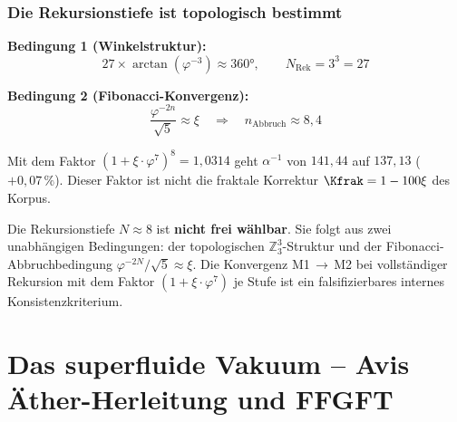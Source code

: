 \subsubsection*{Die Rekursionstiefe ist topologisch bestimmt}

\textbf{Bedingung 1 (Winkelstruktur):}
\[
  27 \times \arctan(\varphi^{-3}) \approx 360°, \qquad N_{\text{Rek}} = 3^3 = 27
\]

\textbf{Bedingung 2 (Fibonacci-Konvergenz):}
\[
  \frac{\varphi^{-2n}}{\sqrt{5}} \approx \xi \quad \Rightarrow \quad n_{\text{Abbruch}} \approx 8{,}4
\]

Mit dem Faktor $(1 + \xi\cdot\varphi^7)^8 = 1{,}0314$ geht $\alpha^{-1}$ von $141{,}44$ auf $137{,}13$ ($+0{,}07\,\%$). Dieser Faktor ist nicht die fraktale Korrektur $\Kfrak = 1-100\xi$ des Korpus.

\begin{keyresult}[Konvergenzkriterium]
Die Rekursionstiefe $N \approx 8$ ist \textbf{nicht frei wählbar}. Sie folgt aus zwei unabhängigen Bedingungen: der topologischen $\mathbb{Z}_3^3$-Struktur und der Fibonacci-Abbruchbedingung $\varphi^{-2N}/\!\sqrt{5} \approx \xi$. Die Konvergenz M1\,$\to$\,M2 bei vollständiger Rekursion mit dem Faktor $(1 + \xi\cdot\varphi^7)$ je Stufe ist ein falsifizierbares internes Konsistenzkriterium.
\end{keyresult}

\section{Das superfluide Vakuum -- Avis Äther-Herleitung und FFGFT}

